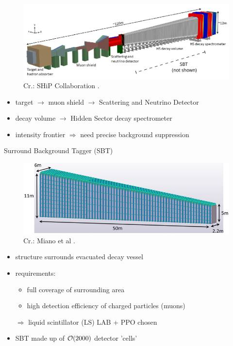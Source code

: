 \documentclass[aspectratio=169]{beamer}
\begin{document}
	\begin{frame}{}
	
	\begin{figure}
		\centering
		\includegraphics[width=.8\textwidth]{pictures/ship-facility.pdf}
		\caption{Cr.: SHiP Collaboration \cite{SHIP-DESIGN-2019}.}
	\end{figure}
	
	
	
	\begin{itemize}
		\item target $\rightarrow$ muon shield $\rightarrow$ Scattering and Neutrino Detector
		\item decay volume $\rightarrow$ Hidden Sector decay spectrometer
		\item intensity frontier $\Rightarrow$ need precise background suppression 
		
	\end{itemize}
\end{frame}



	
	\begin{frame}{Surround Background Tagger (SBT)}
		
		\begin{figure}
			\centering
			\includegraphics[width=.7\textwidth]{pictures/decay_volume.pdf}
			\caption{Cr.: Miano et al \cite{MIANO}.}
		\end{figure}
	\vspace{-.5cm}
		\begin{itemize}
			\item structure surrounds evacuated decay vessel
			\item requirements: 
				\begin{itemize}
					\item full coverage of surrounding area
					\item high detection efficiency of charged particles (muons)
				\end{itemize}
			$\Rightarrow$ liquid scintillator (LS) LAB + PPO chosen
			\item SBT made up of $\order{2000}$ detector 'cells'
			
		\end{itemize}
		
	\end{frame}
	
\end{document}
